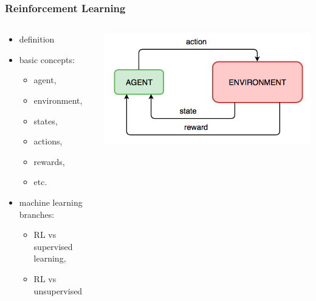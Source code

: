 \begin{frame}
  \frametitle{Reinforcement Learning}
  \begin{columns}
      \begin{column}{0.45\textwidth}
        \begin{itemize}
          \item{definition}
          \item{basic concepts:}
            \begin{itemize}
              \item{agent,}
              \item{environment,}
              \item{states,}
              \item{actions,}
              \item{rewards,}
              \item{etc.}
            \end{itemize}
          \item{machine learning branches:}
            \begin{itemize}
              \item{RL vs supervised learning,}
              \item{RL vs unsupervised}
            \end{itemize}
        \end{itemize}
      \end{column}

      \begin{column}{0.45\textwidth}
        \includegraphics[width=\textwidth]{imgs/rl_model.png}
      \end{column}
  \end{columns}
\end{frame}
